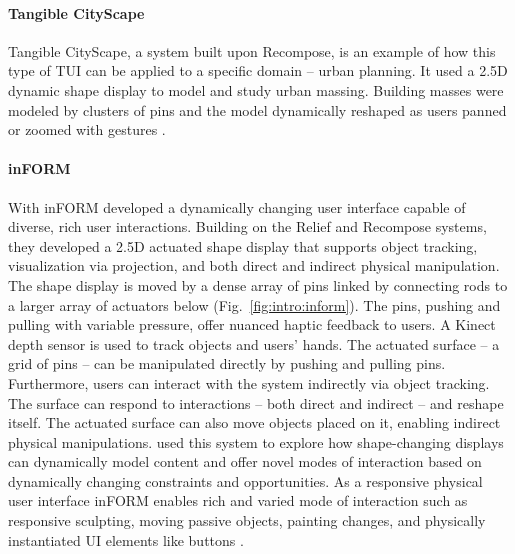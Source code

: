 \documentclass{article}
\begin{document}
\paragraph{Tangible CityScape}
Tangible CityScape, a system built upon Recompose,
is an example of how this type of TUI can be applied to a specific domain -- urban planning.
It used a 2.5D dynamic shape display to model and study urban massing.
Building masses were modeled by clusters of pins and the model dynamically
reshaped as users panned or zoomed with gestures \citep{Tang2013}.

\paragraph{inFORM}
With inFORM \citet{Follmer2013} developed a dynamically changing user interface capable of diverse, rich user interactions. Building on the Relief and Recompose systems, they developed a 2.5D actuated shape display that supports object tracking, visualization via projection, and both direct and indirect physical manipulation. The shape display is moved by a dense array of pins linked by connecting rods to a larger array of actuators below (Fig.~\ref{fig:intro:inform}). The pins, pushing and pulling with variable pressure, offer nuanced haptic feedback to users. A Kinect depth sensor is used to track objects and users' hands. 
The actuated surface -- a grid of pins -- can be manipulated directly by pushing and pulling pins. 
Furthermore, users can interact with the system indirectly via object tracking. 
The surface can respond to interactions -- both direct and indirect -- and reshape itself. 
The actuated surface can also move objects placed on it, enabling indirect physical manipulations.
\citeauthor{Follmer2013} used this system to explore how shape-changing displays can dynamically model content and offer novel modes of interaction based on dynamically changing constraints and opportunities. 
As a responsive physical user interface inFORM enables rich and varied mode of interaction such as responsive sculpting, moving passive objects, painting changes, and physically instantiated UI elements like buttons \citep{Follmer2013}.  
\end{document}
